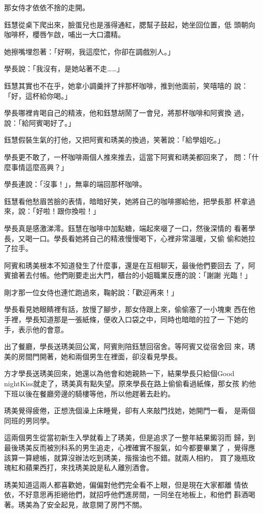 那女侍才依依不捨的走開。

鈺慧從桌下爬出來，臉蛋兒也是漲得通紅，腮幫子鼓起，她坐回位置，低
頭朝向咖啡杯，櫻唇乍啟，哺出一大口濃精。

她擦嘴埋怨著：「好啊，我這麼忙，你卻在調戲別人。」

學長說：「我沒有，是她站著不走……」

鈺慧其實也不在乎，她拿小調羹拌了拌那杯咖啡，推到他面前，笑嘻嘻的
說：「好，這杯給你喝。」

學長哪裡肯喝自己的精液，他和鈺慧胡鬧了一會兒，將那杯咖啡和阿賓換
過，說：「給阿賓喝好了。」

鈺慧假裝生氣的打他，又把阿賓和琇美的換過，笑著說：「給學姐吃。」

學長更不敢了，一杯咖啡兩個人推來推去，這當下阿賓和琇美都回來了，
問：「什麼事情這麼高興？」

學長連說：「沒事！」，無辜的端回那杯咖啡。

鈺慧看他愁眉苦臉的表情，暗暗好笑，她將自己的咖啡挪給他，把學長那
杯拿過來，說：「好啦！跟你換啦！」

學長真是感激涕澪。鈺慧在咖啡中加點糖，端起來啜了一口，然後深情的
看著學長，又喝一口。學長看她將自己的精液慢慢喝下，心裡非常溫暖，又偷
偷和她拉了拉手。

阿賓和琇美根本不知道發生了什麼事，還是在互相聊天，最後他們要回去
了，阿賓搶著去付帳。他們剛要走出大門，櫃台的小姐職業反應的說：「謝謝
光臨！」

剛才那一位女侍也連忙跑過來，鞠躬說：「歡迎再來！」

學長看見她眼睛裡有話，放慢了腳步，那女侍跟上來，偷偷塞了一小塊東
西在他手裡，學長知道那是一張紙條，便收入口袋之中，同時也暗暗的拉了一
下她的手，表示他的會意。

出了餐廳，學長送琇美回公寓，阿賓則陪鈺慧回宿舍。等阿賓又從宿舍回
來，琇美的房間門開著，她和兩個男生在裡面，卻沒看見學長。

方才學長送琇美回來，她還以為他會和她親熱一下，結果學長只給個Good
nightKiss就走了，琇美真有點失望。原來學長在路上偷偷看過紙條，那女孩
約他下班以後在餐廳旁邊的騎樓等他，所以他趕著去赴約。

琇美覺得疲倦，正想洗個澡上床睡覺，卻有人來敲門找她，她開門一看，
是兩個同班的男同學。

這兩個男生從當初新生入學就看上了琇美，但是追求了一整年結果鎩羽而
歸，到最後琇美反而被別科系的男生追走，心裡確實不服氣，如今都要畢業了
，覺得應該算一算總帳，就算沒辦法吃到琇美，揩揩油也不錯。就兩人相約，
買了幾瓶玫瑰紅和蘋果西打，來找琇美說是私人離別酒會。

琇美知道這兩人都喜歡她，偏偏對他們完全看不上眼，但是現在大家都離
情依依，不好意思再拒絕他們，就招呼他們進房間，一同坐在地板上，和他們
斟酒喝著。琇美為了安全起見，故意開了房門不關。

